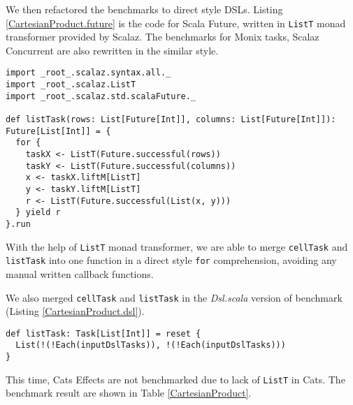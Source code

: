 We then refactored the benchmarks to direct style DSLs. Listing \ref{CartesianProduct.future} is the code for Scala Future, written in \lstinline{ListT} monad transformer provided by Scalaz. The benchmarks for Monix tasks, Scalaz Concurrent are also rewritten in the similar style.

\begin{lstlisting}[float=htbp,caption={Cartesian product for Scala Future, based on \lstinline{ListT} transformer},label={CartesianProduct.future}]
import _root_.scalaz.syntax.all._
import _root_.scalaz.ListT
import _root_.scalaz.std.scalaFuture._

def listTask(rows: List[Future[Int]], columns: List[Future[Int]]): Future[List[Int]] = {
  for {
    taskX <- ListT(Future.successful(rows))
    taskY <- ListT(Future.successful(columns))
    x <- taskX.liftM[ListT]
    y <- taskY.liftM[ListT]
    r <- ListT(Future.successful(List(x, y)))
  } yield r
}.run
\end{lstlisting}

With the help of \lstinline{ListT} monad transformer, we are able to merge \lstinline{cellTask} and \lstinline{listTask} into one function in a direct style \lstinline{for} comprehension, avoiding any manual written callback functions.

We also merged \lstinline{cellTask} and \lstinline{listTask} in the \textit{Dsl.scala} version of benchmark (Listing \ref{CartesianProduct.dsl}).

\begin{lstlisting}[float=htbp,caption={Cartesian product for vanilla CPS functions, in one function},label={CartesianProduct.dsl}]
def listTask: Task[List[Int]] = reset {
  List(!(!Each(inputDslTasks)), !(!Each(inputDslTasks)))
}
\end{lstlisting}

This time, Cats Effects are not benchmarked due to lack of \lstinline{ListT} in Cats. The benchmark result are shown in Table \ref{CartesianProduct}.

